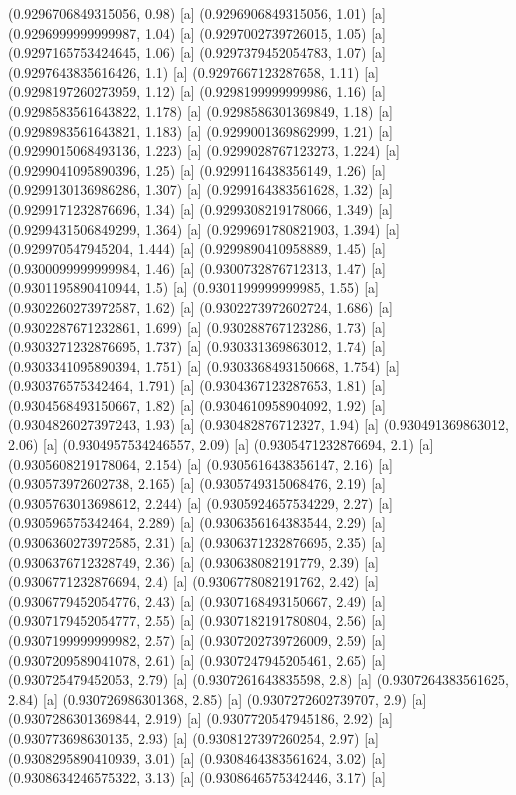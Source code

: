 {{{(0.9296706849315056, 0.98) [a] 
(0.9296906849315056, 1.01) [a] 
(0.9296999999999987, 1.04) [a] 
(0.9297002739726015, 1.05) [a] 
(0.9297165753424645, 1.06) [a] 
(0.9297379452054783, 1.07) [a] 
(0.9297643835616426, 1.1) [a] 
(0.9297667123287658, 1.11) [a] 
(0.9298197260273959, 1.12) [a] 
(0.9298199999999986, 1.16) [a] 
(0.9298583561643822, 1.178) [a] 
(0.9298586301369849, 1.18) [a] 
(0.9298983561643821, 1.183) [a] 
(0.9299001369862999, 1.21) [a] 
(0.9299015068493136, 1.223) [a] 
(0.9299028767123273, 1.224) [a] 
(0.9299041095890396, 1.25) [a] 
(0.9299116438356149, 1.26) [a] 
(0.9299130136986286, 1.307) [a] 
(0.9299164383561628, 1.32) [a] 
(0.9299171232876696, 1.34) [a] 
(0.9299308219178066, 1.349) [a] 
(0.9299431506849299, 1.364) [a] 
(0.9299691780821903, 1.394) [a] 
(0.929970547945204, 1.444) [a] 
(0.9299890410958889, 1.45) [a] 
(0.9300099999999984, 1.46) [a] 
(0.9300732876712313, 1.47) [a] 
(0.9301195890410944, 1.5) [a] 
(0.9301199999999985, 1.55) [a] 
(0.9302260273972587, 1.62) [a] 
(0.9302273972602724, 1.686) [a] 
(0.9302287671232861, 1.699) [a] 
(0.930288767123286, 1.73) [a] 
(0.9303271232876695, 1.737) [a] 
(0.930331369863012, 1.74) [a] 
(0.9303341095890394, 1.751) [a] 
(0.9303368493150668, 1.754) [a] 
(0.930376575342464, 1.791) [a] 
(0.9304367123287653, 1.81) [a] 
(0.9304568493150667, 1.82) [a] 
(0.9304610958904092, 1.92) [a] 
(0.9304826027397243, 1.93) [a] 
(0.930482876712327, 1.94) [a] 
(0.930491369863012, 2.06) [a] 
(0.9304957534246557, 2.09) [a] 
(0.9305471232876694, 2.1) [a] 
(0.9305608219178064, 2.154) [a] 
(0.9305616438356147, 2.16) [a] 
(0.930573972602738, 2.165) [a] 
(0.9305749315068476, 2.19) [a] 
(0.9305763013698612, 2.244) [a] 
(0.9305924657534229, 2.27) [a] 
(0.930596575342464, 2.289) [a] 
(0.9306356164383544, 2.29) [a] 
(0.9306360273972585, 2.31) [a] 
(0.9306371232876695, 2.35) [a] 
(0.9306376712328749, 2.36) [a] 
(0.930638082191779, 2.39) [a] 
(0.9306771232876694, 2.4) [a] 
(0.9306778082191762, 2.42) [a] 
(0.9306779452054776, 2.43) [a] 
(0.9307168493150667, 2.49) [a] 
(0.9307179452054777, 2.55) [a] 
(0.9307182191780804, 2.56) [a] 
(0.9307199999999982, 2.57) [a] 
(0.9307202739726009, 2.59) [a] 
(0.9307209589041078, 2.61) [a] 
(0.9307247945205461, 2.65) [a] 
(0.930725479452053, 2.79) [a] 
(0.9307261643835598, 2.8) [a] 
(0.9307264383561625, 2.84) [a] 
(0.930726986301368, 2.85) [a] 
(0.9307272602739707, 2.9) [a] 
(0.9307286301369844, 2.919) [a] 
(0.9307720547945186, 2.92) [a] 
(0.930773698630135, 2.93) [a] 
(0.9308127397260254, 2.97) [a] 
(0.9308295890410939, 3.01) [a] 
(0.9308464383561624, 3.02) [a] 
(0.9308634246575322, 3.13) [a] 
(0.9308646575342446, 3.17) [a] 
}}}
